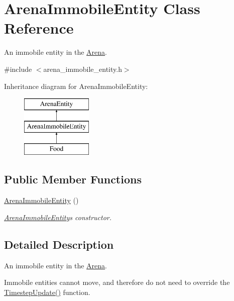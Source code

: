 \hypertarget{class_arena_immobile_entity}{}\section{Arena\+Immobile\+Entity Class Reference}
\label{class_arena_immobile_entity}


An immobile entity in the \mbox{\hyperlink{class_arena}{Arena}}.  




{\ttfamily \#include $<$arena\+\_\+immobile\+\_\+entity.\+h$>$}

Inheritance diagram for Arena\+Immobile\+Entity\+:\begin{figure}[H]
\begin{center}
\leavevmode
\includegraphics[height=3.000000cm]{class_arena_immobile_entity}
\end{center}
\end{figure}
\subsection*{Public Member Functions}
\begin{DoxyCompactItemize}
\item 
\mbox{\hyperlink{class_arena_immobile_entity_ac24bb0af97a140d62dd52124489032fd}{Arena\+Immobile\+Entity}} ()
\begin{DoxyCompactList}\small\item\em \mbox{\hyperlink{class_arena_immobile_entity}{Arena\+Immobile\+Entity}}\textquotesingle{}s constructor. \end{DoxyCompactList}\end{DoxyCompactItemize}


\subsection{Detailed Description}
An immobile entity in the \mbox{\hyperlink{class_arena}{Arena}}. 

Immobile entities cannot move, and therefore do not need to override the \mbox{\hyperlink{class_arena_entity_a203613c40a5cecf47606b2a59adcc3bd}{Timestep\+Update()}} function. 

